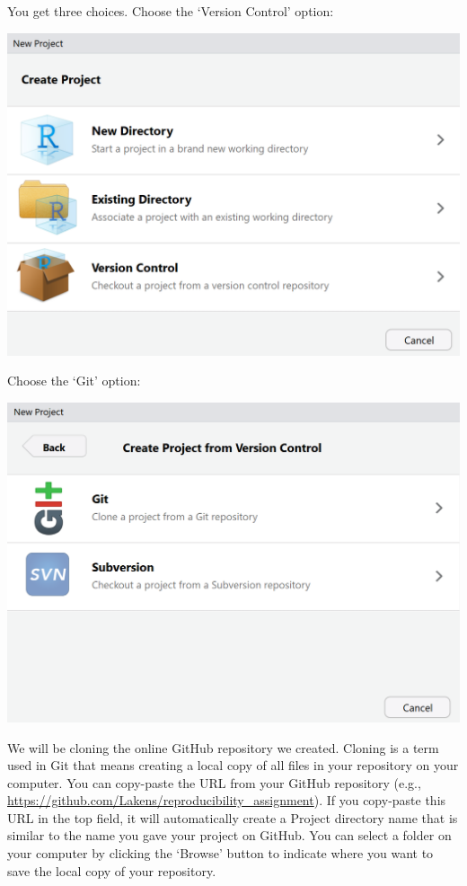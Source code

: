 \documentclass[
  oneside]{krantz}
\begin{document}
You get three choices. Choose the `Version Control' option:

\begin{center}\includegraphics[width=1\linewidth]{images/5eff851f02909023dac665978c716a9d} \end{center}

Choose the `Git' option:

\begin{center}\includegraphics[width=1\linewidth]{images/a37a25fa7b6b9534d8f16154ce417be6} \end{center}

We will be cloning the online GitHub repository we created. Cloning is a term
used in Git that means creating a local copy of all files in your repository on
your computer. You can copy-paste the URL from your GitHub repository (e.g.,
\url{https://github.com/Lakens/reproducibility_assignment}). If you copy-paste this
URL in the top field, it will automatically create a Project directory name that
is similar to the name you gave your project on GitHub. You can select a folder
on your computer by clicking the `Browse' button to indicate where you want to
save the local copy of your repository.
\end{document}
